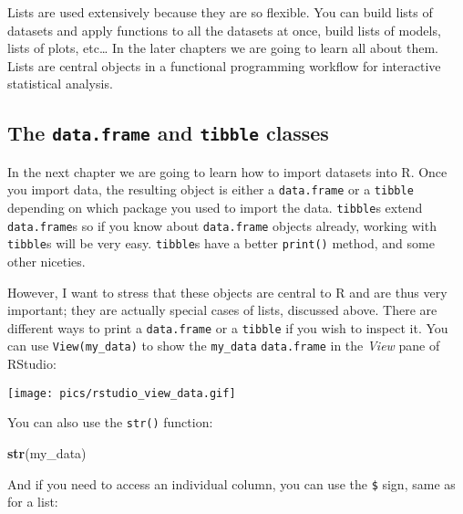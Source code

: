 \documentclass[
]{article}
\newenvironment{Shaded}{\begin{snugshade}}{\end{snugshade}}
\newcommand{\KeywordTok}[1]{\textcolor[rgb]{0.13,0.29,0.53}{\textbf{#1}}}
\newcommand{\NormalTok}[1]{#1}
\newcommand{\OperatorTok}[1]{\textcolor[rgb]{0.81,0.36,0.00}{\textbf{#1}}}
\begin{document}
Lists are used extensively because they are so flexible. You can build lists of datasets and apply
functions to all the datasets at once, build lists of models, lists of plots, etc\ldots{} In the later
chapters we are going to learn all about them. Lists are central objects in a functional programming
workflow for interactive statistical analysis.

\hypertarget{the-data.frame-and-tibble-classes}{%
\subsection{\texorpdfstring{The \texttt{data.frame} and \texttt{tibble} classes}{The data.frame and tibble classes}}\label{the-data.frame-and-tibble-classes}}

In the next chapter we are going to learn how to import datasets into R. Once you import data, the
resulting object is either a \texttt{data.frame} or a \texttt{tibble} depending on which package you used to
import the data. \texttt{tibble}s extend \texttt{data.frame}s so if you know about \texttt{data.frame} objects already,
working with \texttt{tibble}s will be very easy. \texttt{tibble}s have a better \texttt{print()} method, and some other
niceties.

However, I want to stress that these objects are central to R and are thus very important; they are
actually special cases of lists, discussed above. There are different ways to print a \texttt{data.frame} or
a \texttt{tibble} if you wish to inspect it. You can use \texttt{View(my\_data)} to show the \texttt{my\_data} \texttt{data.frame}
in the \emph{View} pane of RStudio:

\texttt{[image: pics/rstudio\_view\_data.gif]}

You can also use the \texttt{str()} function:

\begin{Shaded}
\begin{Highlighting}[]
\KeywordTok{str}\NormalTok{(my\_data)}
\end{Highlighting}
\end{Shaded}

And if you need to access an individual column, you can use the \texttt{\$} sign, same as for a list:

\begin{Shaded}
\end{Shaded}
\end{document}
